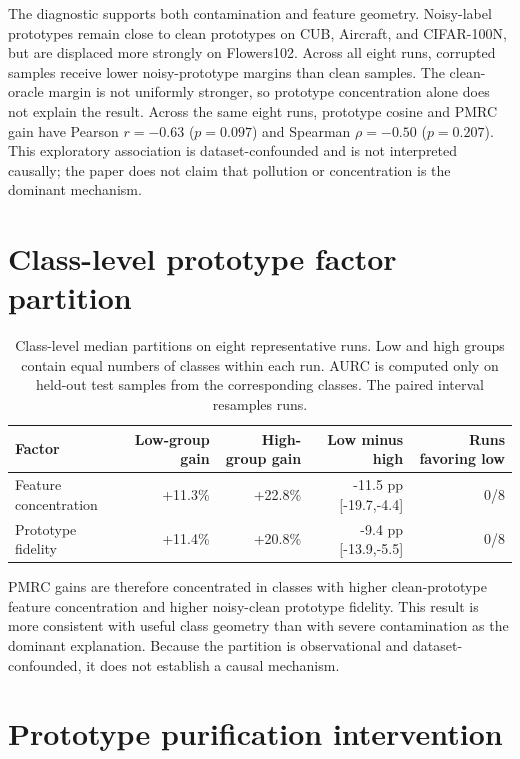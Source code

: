 \documentclass[11pt,a4paper]{article}
\begin{document}
The diagnostic supports both contamination and feature geometry. Noisy-label
prototypes remain close to clean prototypes on CUB, Aircraft, and CIFAR-100N,
but are displaced more strongly on Flowers102. Across all eight runs,
corrupted samples receive lower noisy-prototype margins than clean samples. The
clean-oracle margin is not uniformly stronger, so prototype concentration alone
does not explain the result. Across the same eight runs, prototype cosine and
PMRC gain have Pearson $r=-0.63$ ($p=0.097$) and Spearman $\rho=-0.50$
($p=0.207$). This exploratory association is dataset-confounded and is not
interpreted causally; the paper does not claim that pollution or concentration
is the dominant mechanism.

\section{Class-level prototype factor partition}

\begin{table}[H]
\centering
\caption{Class-level median partitions on eight representative runs. Low and high groups contain equal numbers of classes within each run. AURC is computed only on held-out test samples from the corresponding classes. The paired interval resamples runs.}
\label{tab:prototype-factor}
\small
\begin{tabular}{@{}lrrrr@{}}
\toprule
Factor & Low-group gain & High-group gain & Low minus high & Runs favoring low \\
\midrule
Feature concentration & +11.3\% & +22.8\% & -11.5 pp [-19.7,-4.4] & 0/8 \\
Prototype fidelity & +11.4\% & +20.8\% & -9.4 pp [-13.9,-5.5] & 0/8 \\
\bottomrule
\end{tabular}
\end{table}

PMRC gains are therefore concentrated in classes with higher clean-prototype
feature concentration and higher noisy-clean prototype fidelity. This result is
more consistent with useful class geometry than with severe contamination as
the dominant explanation. Because the partition is observational and
dataset-confounded, it does not establish a causal mechanism.

\section{Prototype purification intervention}
\end{document}
